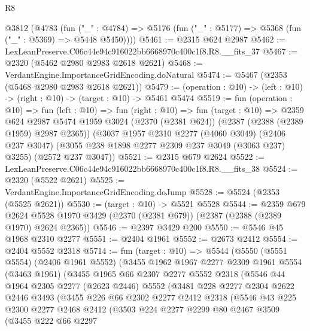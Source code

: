 \begin{lexlean}{R8}
\begin{coremodule}
  @3812
    (@4783
      (fun ("_" : @4784) => @5176 (fun ("_" : @5177) => @5368 (fun ("_" : @5369) => @5448 @5450))))
@5461 := @2315 @624 @2987
@5462 := LexLeanPreserve.C06c44e94c916022bb6668970c400c1f8.R8.__fits_37
@5467 := @2320 (@5462 @2980 @2983 @2618 @2621)
@5468 := VerdantEngine.ImportanceGridEncoding.doNatural
@5474 := @5467 (@2353 (@5468 @2980 @2983 @2618 @2621))
@5479 := (operation : @10) -> (left : @10) -> (right : @10) -> (target : @10) -> @5461 @5474
@5519 := fun (operation : @10) =>
  fun (left : @10) =>
  fun (right : @10) =>
  fun (target : @10) =>
  @2359
    @624
    @2987
    @5474
    @1959
    @3024
    (@2370 (@2381 @624))
    (@2387 (@2388 (@2389 @1959) @2987 @2365))
    (@3037
      @1957
      @2310
      @2277
      (@4060 @3049)
      (@2406 @237 @3047)
      (@3055 @238 @1898 @2277 @2309 @237 @3049 (@3063 @237) @3255)
      (@2572 @237 @3047))
@5521 := @2315 @679 @2624
@5522 := LexLeanPreserve.C06c44e94c916022bb6668970c400c1f8.R8.__fits_38
@5524 := @2320 (@5522 @2621)
@5525 := VerdantEngine.ImportanceGridEncoding.doJump
@5528 := @5524 (@2353 (@5525 @2621))
@5530 := (target : @10) -> @5521 @5528
@5544 := @2359
    @679
    @2624
    @5528
    @1970
    @3429
    (@2370 (@2381 @679))
    (@2387 (@2388 (@2389 @1970) @2624 @2365))
@5546 := @2397 @3429 @200
@5550 := @5546 @45 @1968 @2310 @2277
@5551 := @2404 @1961
@5552 := @2673 @2412
@5554 := @2404 @5552 @2318
@5714 := fun (target : @10) =>
  @5544
    (@5550
      (@5551 @5554)
      (@2406 @1961 @5552)
      (@3455
        @1962
        @1967
        @2277
        @2309
        @1961
        @5554
        (@3463 @1961)
        (@3455
          @1965
          @66
          @2307
          @2277
          @5552
          @2318
          (@5546
            @44
            @1964
            @2305
            @2277
            (@2623 @2446)
            @5552
            (@3481
              @228
              @2277
              @2304
              @2622
              @2446
              @3493
              (@3455
                @226
                @66
                @2302
                @2277
                @2412
                @2318
                (@5546
                  @43
                  @225
                  @2300
                  @2277
                  @2468
                  @2412
                  (@3503
                    @224
                    @2277
                    @2299
                    @80
                    @2467
                    @3509
                    (@3455
                      @222
                      @66
                      @2297

\end{coremodule}
\end{lexlean}
